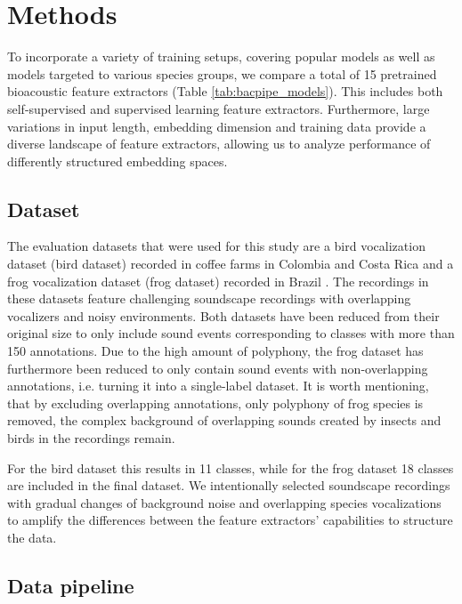 \section{Methods}
\label{sec:methods}



To incorporate a variety of training setups, covering popular models as well as models targeted to various species groups, we compare a total of 15 pretrained bioacoustic feature extractors (Table \ref{tab:bacpipe_models}).
This includes both self-supervised and supervised learning feature extractors. 
Furthermore, large variations in input length, embedding dimension and training data provide a diverse landscape of feature extractors, allowing us to analyze performance of differently structured embedding spaces.

\subsection{Dataset}
\label{ssub:dataset}

The evaluation datasets that were used for this study are a bird vocalization dataset (bird dataset) recorded in coffee farms in Colombia and Costa Rica \cite{vega-hidalgo_collection_2023} and a frog vocalization dataset (frog dataset) recorded in Brazil \cite{canas_dataset_2023}.
The recordings in these datasets feature challenging soundscape recordings with overlapping vocalizers and noisy environments.
Both datasets have been reduced from their original size to only include sound events corresponding to classes with more than 150 annotations.
Due to the high amount of polyphony, the frog dataset has furthermore been reduced to only contain sound events with non-overlapping annotations, i.e. turning it into a single-label dataset.
It is worth mentioning, that by excluding overlapping annotations, only polyphony of frog species is removed, the complex background of overlapping sounds created by insects and birds in the recordings remain.

For the bird dataset this results in 11 classes, while for the frog dataset 18 classes are included in the final dataset.
We intentionally selected soundscape recordings with gradual changes of background noise and overlapping species vocalizations to amplify the differences between the feature extractors' capabilities to structure the data.




\subsection{Data pipeline}
\label{ssub:data_pipe}

